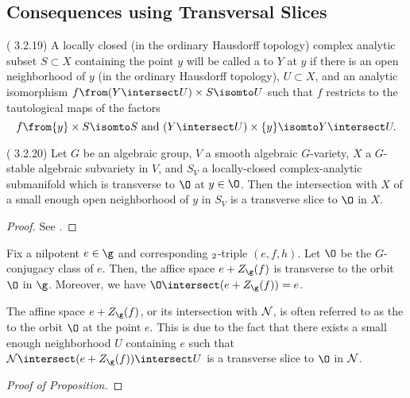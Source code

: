 \subsection{Consequences using Transversal Slices}
\begin{defn}
  (\cite{cg} 3.2.19) A locally closed (in the ordinary Hausdorff topology) complex
  analytic subset \(S \subset X\) containing the point \(y\) will be
  called a  to \(Y\) at \(y\) if there is an open
  neighborhood of \(y\) (in the ordinary Hausdorff topology), \(U
  \subset X\), and an analytic isomorphism \(f \from (Y \intersect U)
  \times S \isomto U\) such that \(f\) restricts to the tautological
  maps of the factors \[
    f \from \{y\} \times S \isomto S \text{ and } (Y \intersect U)
    \times \{y\} \isomto Y \intersect U.
  \]
\end{defn}
\begin{lem}
  (\cite{cg} 3.2.20) Let \(G\) be an algebraic group, \(V\) a smooth
  algebraic \(G\)-variety, \(X\) a \(G\)-stable algebraic
  subvariety in \(V\), and \(S_V\) a locally-closed complex-analytic
  submanifold which is transverse to \(\O\) at \(y \in \O\). Then the
  intersection with \(X\) of a small enough open neighborhood of \(y\)
  in \(S_V\) is a transverse slice to \(\O\) in \(X\). 
\end{lem}
\begin{proof}
  See \cite{cg}.
\end{proof}
\begin{prop}
  Fix a nilpotent \(e \in \g\) and corresponding \(\sl_2\)-triple
  \((e,f,h)\). Let \(\O\) be the \(G\)-conjugacy class of \(e\). Then,
  the affice space \(e + Z_\g(f)\) is transverse to the orbit \(\O\)
  in \(\g\). Moreover, we have \(\O \intersect (e + Z_\g(f)) = e\).
\end{prop}
\begin{rmk}
  The affine space \(e + Z_\g(f)\), or its intersection with \(\mathcal{N}\),
  is often referred to as the  to the orbit \(\O\)
  at the point \(e\). This is due to the fact that there exists a
  small enough neighborhood \(U\) containing \(e\) such that \(\cN
  \intersect (e + Z_\g(f)) \intersect U\) is a transverse slice to
  \(\O\) in \(\mathcal{N}\).
\end{rmk}
\begin{proof}[Proof of Proposition]
  
\end{proof}
